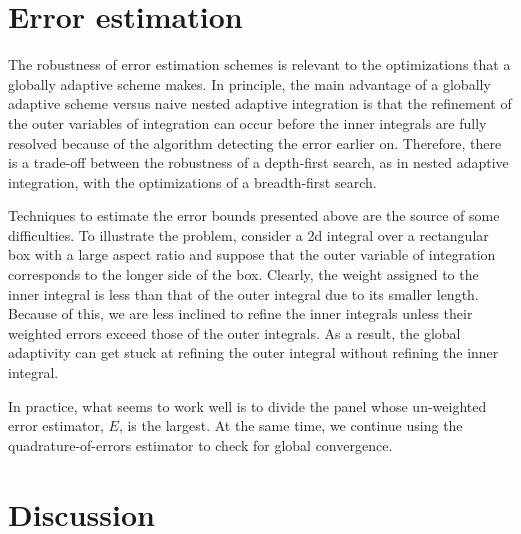 \documentclass{article}
\begin{document}
\section{Error estimation}

The robustness of error estimation schemes is relevant to the optimizations that
a globally adaptive scheme makes. In principle, the main advantage of a globally
adaptive scheme versus naive nested adaptive integration is that the refinement
of the outer variables of integration can occur before the inner integrals are
fully resolved because of the algorithm detecting the error earlier on.
Therefore, there is a trade-off between the robustness of a depth-first search,
as in nested adaptive integration, with the optimizations of a breadth-first
search.

Techniques to estimate the error bounds presented above are the source of some
difficulties. To illustrate the problem, consider a 2d integral over a
rectangular box with a large aspect ratio and suppose that the outer variable of
integration corresponds to the longer side of the box. Clearly, the weight
assigned to the inner integral is less than that of the outer integral due to
its smaller length. Because of this, we are less inclined to refine the inner
integrals unless their weighted errors exceed those of the outer integrals. As a
result, the global adaptivity can get stuck at refining the outer integral
without refining the inner integral.

In practice, what seems to work well is to divide the panel whose un-weighted
error estimator, $E$, is the largest. At the same time, we continue using the
quadrature-of-errors estimator to check for global convergence.

\section{Discussion}
\end{document}
